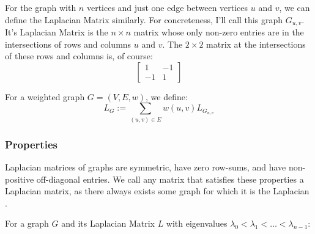 For the graph with $n$ vertices and just one edge between vertices $u$ and $v$,
we can define the Laplacian Matrix similarly. For concreteness, I'll call this
graph $G_{u,v}$. It's Laplacian Matrix is the $n \times n$ matrix whose only
non-zero entries are in the intersections of rows and columns $u$ and $v$. The
$2 \times 2$ matrix at the intersections of these rows and columns is, of
course:
\begin{equation}
    \begin{bmatrix}
        1 & -1\\
        -1 & 1
    \end{bmatrix}
\end{equation}

For a weighted graph $G = (V,E,w)$, we define:
\begin{equation}
    L_G := \sum_{(u,v) \in E} w(u,v)L_{G_{u,v}}
\end{equation}

\subsubsection{Properties}
\label{laplacianMatrices:properties}
Laplacian matrices of graphs are symmetric, have zero row-sums, and have
non-positive off-diagonal entries. We call any matrix that satisfies these
properties a Laplacian matrix, as there always exists some graph for which it is
the Laplacian \cite{Spielman:2010}.

For a graph $G$ and its Laplacian Matrix $L$ with eigenvalues
$\lambda_0<\lambda_1<\ldots<\lambda_{n-1}$:

